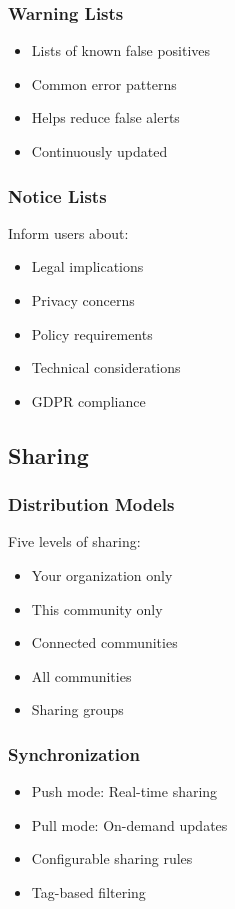 \subsubsection{Warning Lists}
\begin{itemize}
    \item Lists of known false positives
    \item Common error patterns
    \item Helps reduce false alerts
    \item Continuously updated
\end{itemize}

\subsubsection{Notice Lists}
Inform users about:
\begin{itemize}
    \item Legal implications
    \item Privacy concerns
    \item Policy requirements
    \item Technical considerations
    \item GDPR compliance
\end{itemize}

\subsection{Sharing}

\subsubsection{Distribution Models}
Five levels of sharing:
\begin{itemize}
    \item Your organization only
    \item This community only
    \item Connected communities
    \item All communities
    \item Sharing groups
\end{itemize}

\subsubsection{Synchronization}
\begin{itemize}
    \item Push mode: Real-time sharing
    \item Pull mode: On-demand updates
    \item Configurable sharing rules
    \item Tag-based filtering
\end{itemize}

